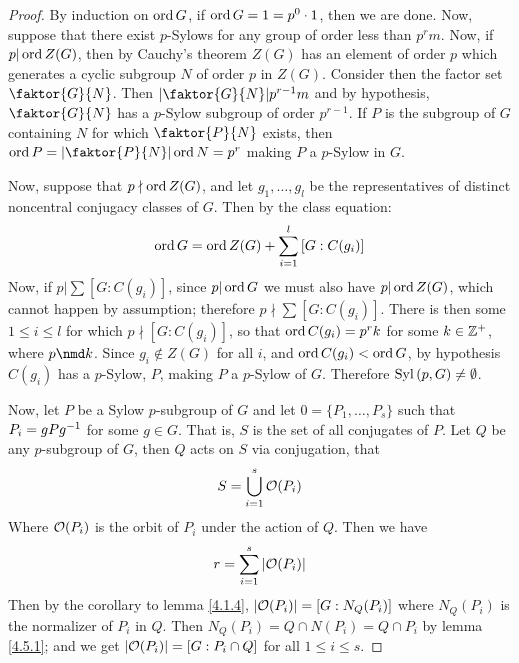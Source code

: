 \begin{proof}
    By induction on $\operatorname{ord}{G}$, if $\operatorname{ord}{G}=1=p^0 \cdot 1$, then we are done.
    Now, suppose that there exist $p$-Sylows for any group of order less than
    $p^rm$. Now, if $p|\operatorname{ord}{Z(G)}$, then by Cauchy's theorem $Z(G)$ has an element
    of order $p$ which generates a cyclic subgroup $N$ of order $p$ in $Z(G)$.
    Consider then the factor set $\faktor{G}{N}$. Then $|\faktor{G}{N}|p^{r-1}m$
    and by hypothesis, $\faktor{G}{N}$ has a $p$-Sylow subgroup of order
    $p^{r-1}$. If $P$ is the subgroup of $G$ containing $N$ for which
    $\faktor{P}{N}$ exists, then $\ord{P}=|\faktor{P}{N}|\ord{N}=p^r$ making $P$
    a $p$-Sylow in $G$.

    Now, suppose that  $p \nmid \operatorname{ord}{Z(G)}$, and let $g_1, \dots, g_l$ be the
    representatives of distinct noncentral conjugacy classes of $G$. Then by the
    class equation:
    \begin{equation*}
        \operatorname{ord}{G}=\operatorname{ord}{Z(G)}+\sum_{i=1}^l{[G:C(g_i)]}
    \end{equation*}
    Now, if $p|\sum{[G:C(g_i)]}$, since $p|\operatorname{ord}{G}$ we must also have
    $p|\operatorname{ord}{Z(G)}$, which cannot happen by assumption; therefore $p \nmid
    \sum{[G:C(g_i)]}$. There is then some $1 \leq i \leq l$ for which  $p \nmid
    [G:C(g_i)]$, so that $\operatorname{ord}{C(g_i)}=p^rk$ for some $k \in \mathbb{Z}^+$, where  $p
    \nmd k$. Since  $g_i \notin Z(G)$ for all $i$, and $\operatorname{ord}{C(g_i)}<\operatorname{ord}{G}$,
    by hypothesis $C(g_i)$ has a $p$-Sylow, $P$, making  $P$ a $p$-Sylow of $G$.
    Therefore $\operatorname{Syl}{(p,G)} \neq \emptyset$.

    Now, let $P$ be a Sylow $p$-subgroup of $G$ and let  $0=\{P_1, \dots, P_s\}$
    such that $P_i=gPg^{-1}$ for some $g \in G$. That is,  $S$ is the set of
    all conjugates of  $P$. Let $Q$ be any $p$-subgroup of $G$, then $Q$ acts on
     $S$ via conjugation, that
     \begin{equation*}
         S=\bigcup_{i=1}^s{\mathcal{O}(P_i)}
     \end{equation*}
     Where $\mathcal{O}(P_i)$ is the orbit of $P_i$ under the action of  $Q$. Then we
     have
     \begin{equation*}
         r=\sum_{i=1}^s{|\mathcal{O}(P_i)|}
     \end{equation*}
     Then by the corollary to lemma \ref{4.1.4}, $|\mathcal{O}(P_i)|=[G:N_Q(P_i)]$ where
     $N_Q(P_i)$ is the normalizer of $P_i$ in $Q$. Then $N_Q(P_i)=Q \cap N(P_i)=Q
     \cap P_i$ by lemma \ref{4.5.1}; and we get $|\mathcal{O}(P_i)|=[G:P_i \cap Q]$ for
     all $1 \leq i \leq s$.


\end{proof}
